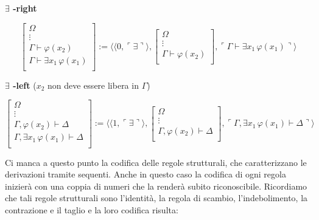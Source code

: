 \vspace{0.5cm}

\textbf{$\exists$ -right}

$$
\left [
\begin{array}{c}
\Omega\\
\vdots\\
\Gamma \vdash \varphi(x_2)\\
\hline
\Gamma  \vdash \exists x_1\,\varphi(x_1)\\
\end{array}
\right ]
:= \langle \langle 0,\ulcorner \exists \urcorner \rangle ,
\left [
\begin{array}{c}
\Omega\\
\vdots\\
\Gamma \vdash \varphi(x_2)\\
\end{array}
\right ],
\ulcorner \Gamma \vdash \exists x_1\,\varphi(x_1) \urcorner \rangle
$$

\vspace{0.5cm}

\textbf{$\exists$ -left} ($x_2$ non deve essere libera in $\Gamma$)



$$
\left [
\begin{array}{c}
\Omega\\
\vdots\\
\Gamma, \varphi(x_2) \vdash \Delta\\
\hline
\Gamma, \exists x_1\,\varphi(x_1) \vdash \Delta\\
\end{array}
\right ]
:= \langle \langle 1,\ulcorner \exists \urcorner \rangle ,
\left [
\begin{array}{c}
\Omega\\
\vdots\\
\Gamma, \varphi(x_2) \vdash \Delta\\
\end{array}
\right ],
\ulcorner \Gamma, \exists x_1\,\varphi(x_1) \vdash \Delta \urcorner \rangle
$$




Ci manca a questo punto la codifica delle regole strutturali, che caratterizzano le derivazioni tramite sequenti. Anche in questo caso la codifica di ogni regola inizier\`a con una coppia di numeri che la render\`a subito riconoscibile. Ricordiamo che tali regole strutturali sono l'identit\`a, la regola di scambio, l'indebolimento, la contrazione e il taglio e la loro codifica risulta:


